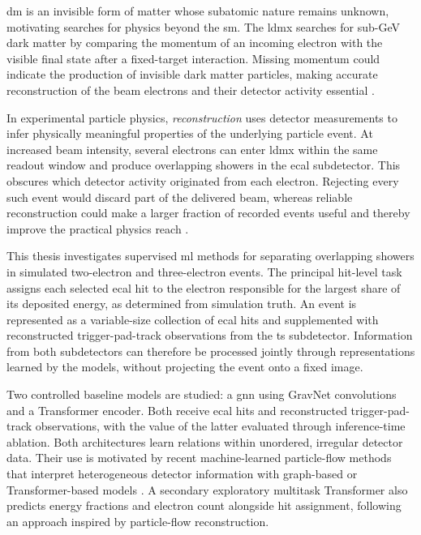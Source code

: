 \Gls{dm} is an invisible form of matter whose subatomic nature remains
unknown, motivating searches for physics beyond the \gls{sm}. The \gls{ldmx}
searches for sub-GeV dark matter by comparing the momentum of an incoming
electron with the visible final state after a fixed-target interaction.
Missing momentum could indicate the production of invisible dark matter
particles, making accurate reconstruction of the beam electrons and their
detector activity essential
\cite{cirelli2026-darkmatter,akesson2018-ldmx,ldmx2025-overview}.

In experimental particle physics, \emph{reconstruction} uses detector
measurements to infer physically meaningful properties of the underlying
particle event. At increased beam intensity, several electrons can enter
\gls{ldmx} within the same readout window and produce overlapping showers in
the \gls{ecal} subdetector. This obscures which detector activity originated
from each electron. Rejecting every such event would discard part of the
delivered beam, whereas reliable reconstruction could make a larger fraction
of recorded events useful and thereby improve the practical physics reach
\cite{ldmx2025-overview}.

This thesis investigates supervised \gls{ml} methods for separating
overlapping showers in simulated two-electron and three-electron events. The
principal hit-level task assigns each selected \gls{ecal} hit to the electron
responsible for the largest share of its deposited energy, as determined from
simulation truth. An event is represented as a variable-size collection of
\gls{ecal} hits and supplemented with reconstructed trigger-pad-track
observations from the \gls{ts} subdetector. Information from both subdetectors
can therefore be processed jointly through representations learned by the
models, without projecting the event onto a fixed image.

Two controlled baseline models are studied: a \gls{gnn} using GravNet
convolutions and a Transformer encoder. Both receive \gls{ecal} hits and
reconstructed trigger-pad-track observations, with the value of the latter
evaluated through inference-time ablation. Both architectures learn relations within unordered,
irregular detector data. Their use is motivated by recent machine-learned
particle-flow methods that interpret heterogeneous detector information with
graph-based or Transformer-based models
\cite{qasim2019-gravnet,pata2021-mlpf,pata2026-mlpf}. A secondary exploratory
multitask Transformer also predicts energy fractions and electron count
alongside hit assignment, following an approach inspired by particle-flow
reconstruction.


